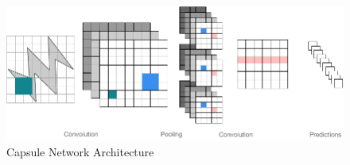 \begin{figure}[!htbp]
  \centering
  \includegraphics[width=\linewidth,height=\textheight,keepaspectratio]{images/CapsNet.png}
  \caption{Capsule Network Architecture}
  \label{k}
\end{figure}
\FloatBarrier
